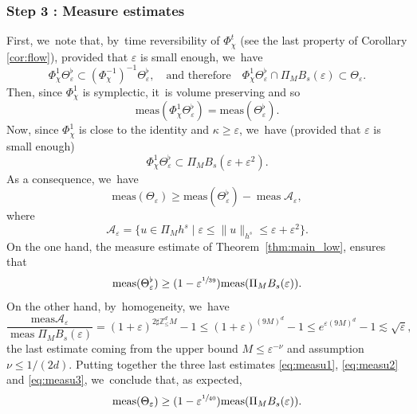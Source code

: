 \documentclass[10pt,a4paper]{amsart}
\theoremstyle{plain}
\theoremstyle{definition}
\DeclareMathOperator{\meas}{meas}
\newcommand{\1}{\mathbf{1}}
\let\epsilon\varepsilon
\begin{document}
\subsubsection*{Step 3 : Measure estimates}
First, we~note that, by~time reversibility of $\Phi_\chi^{t}$ (see the last property of Corollary \ref{cor:flow}), provided that $\varepsilon$ is small enough, we~have\vspace*{-3pt}
\[
\Phi_\chi^{1} \Theta_\varepsilon^\flat \subset (\Phi_\chi^{-1})^{-1} \Theta_\varepsilon^\flat,\quad\text{and therefore}\quad\Phi_{\chi}^{1}\Theta_{\epsilon}^{\flat}\cap \Pi_{M}B_{s}(\epsilon)\subset \Theta_{\epsilon}.
\]
Then, since $\Phi_\chi^{1} $ is symplectic, it~is volume preserving and so\vspace*{-3pt}
\[
\mathrm{meas} (\Phi_\chi^{1} \Theta_\varepsilon^\flat) = \mathrm{meas} (\Theta_\varepsilon^\flat).
\]
Now, since $\Phi_\chi^{1}$ is close to the identity and $\kappa \geq \varepsilon$, we~have (provided that $\varepsilon$ is small enough)\vspace*{-3pt}
\[
\Phi_\chi^{1} \Theta_\varepsilon^\flat \subset \Pi_M B_s(\varepsilon + \varepsilon^2).
\]
As a consequence, we~have\vspace*{-3pt}
\begin{equation}
\label{eq:measu1}
\mathrm{meas} (\Theta_\varepsilon) \geq \mathrm{meas} (\Theta_\varepsilon^{\flat}) -\meas \mathcal{A}_\varepsilon,
\end{equation}
where\vspace*{-3pt}
\[
\mathcal{A}_\varepsilon = \{ u\in \Pi_M h^s \mid \varepsilon \leq \| u\|_{h^s} \leq \varepsilon+ \varepsilon^2 \}.
\]
On the one hand, the measure estimate of Theorem~\ref{thm:main_low}, ensures that\vspace*{-3pt}
\begin{equation}
\label{eq:measu2}
\mathrm{meas}(\Theta_{\varepsilon}^\flat) \geq (1 - \varepsilon^{\sfrac{1}{39}})\mathrm{meas}(\Pi_{M} B_s(\varepsilon)).
\end{equation}
On the other hand, by~homogeneity, we~have\vspace*{-3pt}
\begin{equation}
\label{eq:measu3}
\frac{\mathrm{meas} \mathcal{A}_\varepsilon}{\meas \Pi_M B_s(\varepsilon)} = (1+ \varepsilon)^{2\sharp \mathbb{Z}^d_\leq M} - 1 \leq (1+ \varepsilon)^{(9M)^d} -1 \leq e^{\varepsilon (9M)^d} - 1 \lesssim \sqrt{\varepsilon},
\end{equation}
the last estimate coming from the upper bound $M\leq \varepsilon^{-\nu}$ and assumption $\nu \leq 1/(2d)$. Putting together the three last estimates \eqref{eq:measu1}, \eqref{eq:measu2} and \eqref{eq:measu3}, we~conclude that, as expected,\vspace*{-3pt}
\[
\mathrm{meas}(\Theta_{\varepsilon}) \geq (1 - \varepsilon^{\sfrac{1}{40}})\mathrm{meas}(\Pi_{M} B_s(\varepsilon)).
\]
\end{document}

